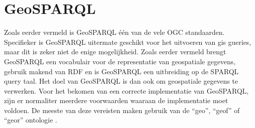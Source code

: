 \section{GeoSPARQL}
\label{sec:geosparql}

Zoals eerder vermeld is GeoSPARQL één van de vele OGC standaarden. Specifieker is GeoSPARQL uitermate geschikt voor het uitvoeren van \acrshort{gis} gueries, maar dit is zeker niet de enige mogelijkheid. Zoals eerder vermeld brengt GeoSPARQL een vocabulair voor de representatie van geospatiale gegevens, gebruik makend van RDF en is GeoSPARQL een uitbreiding op de SPARQL query taal. Het doel van GeoSPARQL is dan ook om geospatiale gegevens te verwerken. Voor het bekomen van een correcte implementatie van GeoSPARQL, zijn er normaliter meerdere voorwaarden waaraan de implementatie moet voldoen. De meeste van deze vereisten maken gebruik van de ``geo'', ``geof'' of ``geor'' ontologie \cite{ogcdocs}.

